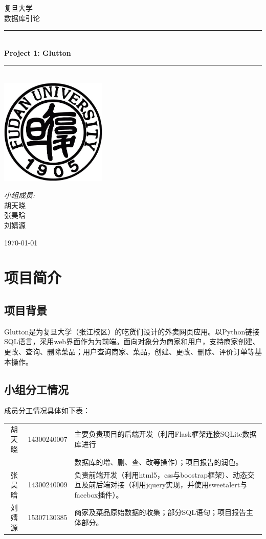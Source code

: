 \documentclass[12pt, oneside,a4paper]{article}
\newcommand{\HRule}{\rule{\linewidth}{0.5mm}}
\begin{document}
\begin{titlepage}
\begin{center}
\textsc{\LARGE 复旦大学}\\[1.5cm]
\textsc{\Large 数据库引论}\\[0.5cm]
\HRule \\[0.4cm]
{ \huge \bfseries Project 1: Glutton}\\[0.4cm]
\HRule \\[1.5cm]
\includegraphics[width=2in]{logo.jpg}\\[1cm]
\begin{minipage}{0.4\textwidth}
\begin{flushleft} \large
\begin{center}
\emph{小组成员:}\\
胡天晓\\
张昊晗\\
刘婧源
\end{center}
\end{flushleft}
\end{minipage}
\vfill
{\large \today}
\end{center}
\end{titlepage}

\section{项目简介}
\subsection{项目背景}
Glutton是为复旦大学（张江校区）的吃货们设计的外卖网页应用。以Python链接SQL语言，采用web界面作为为前端。面向对象分为商家和用户，支持商家创建、更改、查询、删除菜品；用户查询商家、菜品，创建、更改、删除、评价订单等基本操作。
\subsection{小组分工情况}
成员分工情况具体如下表：
\begin{table}[!h]
\begin{tabular}{|c|c|l|}
\hline
胡天晓 & 14300240007 & 主要负责项目的后端开发（利用Flask框架连接SQLite数据库进行\\
 & & 数据库的增、删、查、改等操作）；项目报告的润色。 \\
\hline
张昊晗 & 14300240009 & 负责前端开发（利用html5，css与boostrap框架）、动态交互及前后端对接（利用jquery实现，并使用sweetalert与facebox插件）。 \\
\hline
刘婧源 & 15307130385 & 商家及菜品原始数据的收集；部分SQL语句；项目报告主体部分。\\
\hline
\end{tabular}
\end{table} 
\end{document}
